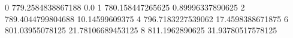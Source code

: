 0 779.2584838867188 0.0
1 780.158447265625 0.89996337890625
2 789.4044799804688 10.14599609375
4 796.7183227539062 17.4598388671875
6 801.03955078125 21.78106689453125
8 811.1962890625 31.93780517578125
